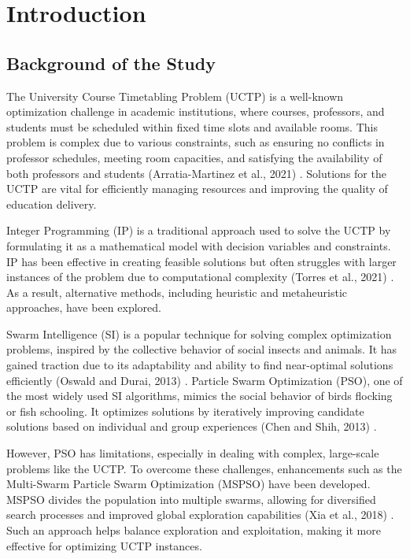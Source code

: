 \documentclass{article}
\newenvironment{subs}
  {\adjustwidth{3em}{0pt}}
  {\endadjustwidth}
\begin{document}
    \section{Introduction}
    \label{sec:introduction}
    \begin{subs}
    \subsection{Background of the Study}
    \label{subsec:background}
    
    The University Course Timetabling Problem (UCTP) is a well-known optimization challenge in academic institutions, where courses, professors, and students must be scheduled within fixed time slots and available rooms. This problem is complex due to various constraints, such as ensuring no conflicts in professor schedules, meeting room capacities, and satisfying the availability of both professors and students (Arratia-Martinez et al., 2021) \cite{Arratia-Martinez2021-io}. Solutions for the UCTP are vital for efficiently managing resources and improving the quality of education delivery.
    
    Integer Programming (IP) is a traditional approach used to solve the UCTP by formulating it as a mathematical model with decision variables and constraints. IP has been effective in creating feasible solutions but often struggles with larger instances of the problem due to computational complexity (Torres et al., 2021) \cite{Torres2021-ir}. As a result, alternative methods, including heuristic and metaheuristic approaches, have been explored.
    
    Swarm Intelligence (SI) is a popular technique for solving complex optimization problems, inspired by the collective behavior of social insects and animals. It has gained traction due to its adaptability and ability to find near-optimal solutions efficiently (Oswald and Durai, 2013) \cite{Oswald_C2013-zo}. Particle Swarm Optimization (PSO), one of the most widely used SI algorithms, mimics the social behavior of birds flocking or fish schooling. It optimizes solutions by iteratively improving candidate solutions based on individual and group experiences (Chen and Shih, 2013) \cite{Chen2013-cp}.
    
    However, PSO has limitations, especially in dealing with complex, large-scale problems like the UCTP. To overcome these challenges, enhancements such as the Multi-Swarm Particle Swarm Optimization (MSPSO) have been developed. MSPSO divides the population into multiple swarms, allowing for diversified search processes and improved global exploration capabilities (Xia et al., 2018) \cite{XIA2018126}. Such an approach helps balance exploration and exploitation, making it more effective for optimizing UCTP instances.
    

\end{subs}
\end{document}
